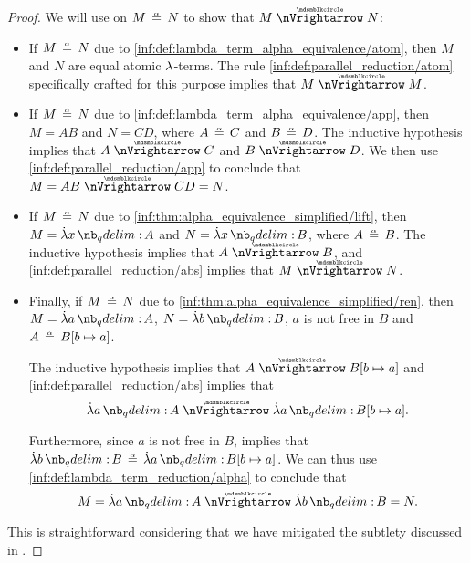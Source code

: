 \begin{proof}
   We will use  on \( M \aequiv N \) to show that \( M \ppred N \):
  \begin{itemize}
    \item If \( M \aequiv N \) due to \ref{inf:def:lambda_term_alpha_equivalence/atom}, then \( M \) and \( N \) are equal atomic \( {\mathrm \lambda} \)-terms. The rule \ref{inf:def:parallel_reduction/atom} specifically crafted for this purpose implies that \( M \ppred M \).

    \item If \( M \aequiv N \) due to \ref{inf:def:lambda_term_alpha_equivalence/app}, then \( M = AB \) and \( N = CD \), where \( A \aequiv C \) and \( B \aequiv D \). The inductive hypothesis implies that \( A \ppred C \) and \( B \ppred D \). We then use \ref{inf:def:parallel_reduction/app} to conclude that \( M = AB \ppred CD = N \).

    \item If \( M \aequiv N \) due to \ref{inf:thm:alpha_equivalence_simplified/lift}, then \( M = \qabs x A \) and \( N = \qabs x B \), where \( A \aequiv B \). The inductive hypothesis implies that \( A \ppred B \), and \ref{inf:def:parallel_reduction/abs} implies that \( M \ppred N \).

    \item Finally, if \( M \aequiv N \) due to \ref{inf:thm:alpha_equivalence_simplified/ren}, then \( M = \qabs a A \), \( N = \qabs b B \), \( a \) is not free in \( B \) and \( A \aequiv B[b \mapsto a] \).

    The inductive hypothesis implies that \( A \ppred B[b \mapsto a] \) and \ref{inf:def:parallel_reduction/abs} implies that
    \begin{equation*}
      \qabs a A \ppred \qabs a B[b \mapsto a].
    \end{equation*}

    Furthermore, since \( a \) is not free in \( B \),  implies that \( \qabs b B \aequiv \qabs a B[b \mapsto a] \). We can thus use \ref{inf:def:lambda_term_reduction/alpha} to conclude that
    \begin{equation*}
      M = \qabs a A \ppred \qabs b B = N.
    \end{equation*}
  \end{itemize}

   This is straightforward considering that we have mitigated the subtlety discussed in .


\end{proof}
